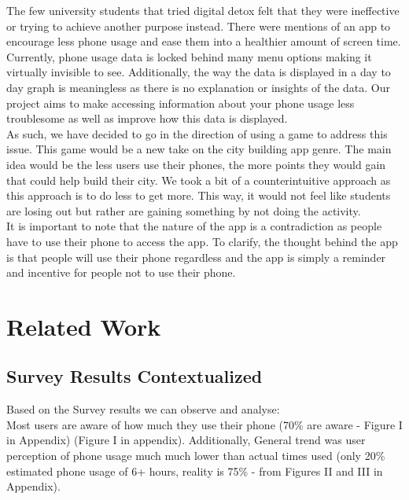 \documentclass[sigconf, 11pt]{acmart}
\begin{document}
The few university students that tried digital detox felt that they were ineffective or trying to achieve another purpose instead. There were mentions of an app to encourage less phone usage and ease them into a healthier amount of screen time. 
\\

Currently, phone usage data is locked behind many menu options making it virtually invisible to see. Additionally, the way the data is displayed in a day to day graph is meaningless as there is no explanation or insights of the data. Our project aims to make accessing information about your phone usage less troublesome as well as improve how this data is displayed. 
\\

As such, we have  decided to go in the direction of using a game to address this issue. This game would be a new take on the city building app genre. The main idea would be the less users use their phones, the more points they would gain that could help build their city. We took a bit of a counterintuitive approach as this approach is to do less to get more. This way, it would not feel like students are losing out but rather are gaining something by not doing the activity.
\\

It is important to note that the nature of the app is a contradiction as people have to use their phone to access the app. To clarify, the thought behind the app is that people will use their phone regardless and the app is simply a reminder and incentive for people not to use their phone.

\section{Related Work}
\subsection{Survey Results Contextualized}
Based on the Survey results we can observe and analyse:
\\

Most users are aware of how much they use their phone (70\% are aware - Figure I in Appendix) (Figure I in appendix). Additionally, General trend was user perception of phone usage much much lower than actual times used (only 20\% estimated phone usage of 6+ hours, reality is 75\% - from Figures II and III in Appendix).
\\
\end{document}
